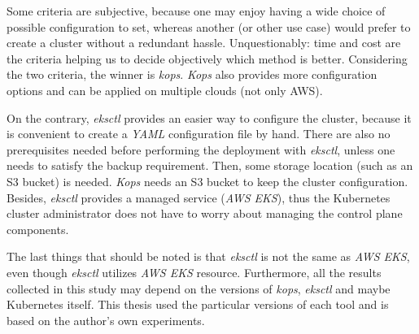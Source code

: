 Some criteria are subjective, because one may enjoy having a wide choice of possible configuration to set, whereas another (or other use case) would prefer to create a cluster without a redundant hassle. Unquestionably: time and cost are the criteria helping us to decide objectively which method is better. Considering the two criteria, the winner is \textit{kops}. \textit{Kops} also provides more configuration options and can be applied on multiple clouds (not only AWS).

On the contrary, \textit{eksctl} provides an easier way to configure the cluster, because it is convenient to create a \textit{YAML} configuration file by hand. There are also no prerequisites needed before performing the deployment with \textit{eksctl}, unless one needs to satisfy the backup requirement. Then, some storage location (such as an S3 bucket) is needed. \textit{Kops} needs an S3 bucket to keep the cluster configuration. Besides, \textit{eksctl} provides a managed service (\textit{AWS EKS}), thus the Kubernetes cluster administrator does not have to worry about managing the control plane components.

The last things that should be noted is that \textit{eksctl} is not the same as \textit{AWS EKS}, even though \textit{eksctl} utilizes \textit{AWS EKS} resource. Furthermore, all the results collected in this study may depend on the versions of \textit{kops}, \textit{eksctl} and maybe Kubernetes itself. This thesis used the particular versions of each tool and is based on the author's own experiments.
